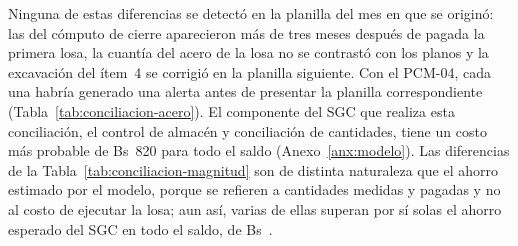 Ninguna de estas diferencias se detectó en la planilla del mes en que se originó: las del cómputo de cierre aparecieron más de tres meses después de pagada la primera losa, la cuantía del acero de la losa no se contrastó con los planos y la excavación del ítem~4 se corrigió en la planilla siguiente. Con el PCM-04, cada una habría generado una alerta antes de presentar la planilla correspondiente (Tabla~\ref{tab:conciliacion-acero}). El componente del SGC que realiza esta conciliación, el control de almacén y conciliación de cantidades, tiene un costo más probable de Bs~820 para todo el saldo (Anexo~\ref{anx:modelo}). Las diferencias de la Tabla~\ref{tab:conciliacion-magnitud} son de distinta naturaleza que el ahorro estimado por el modelo, porque se refieren a cantidades medidas y pagadas y no al costo de ejecutar la losa; aun así, varias de ellas superan por sí solas el ahorro esperado del SGC en todo el saldo, de Bs~\AhorroMedia{}.

